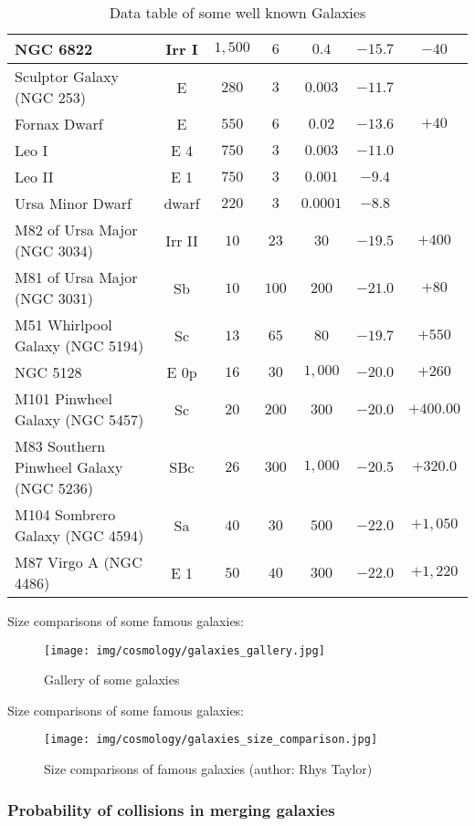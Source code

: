 \begin{table}[H]
{\begin{tabular}{|l|c|c|c|c|c|c|}
		NGC 6822 & Irr I & $1,500$ & $6$ & $0.4$ & $-15.7$ & $-40$ \\ \hline
		Sculptor Galaxy (NGC 253) & E & $280$ & $3$ & $0.003$ & $-11.7$ &  \\ \hline
		Fornax Dwarf & E & $550$ & $6$ & $0.02$ & $-13.6$ & $+40$  \\ \hline
		Leo I & E 4 & $750$ & $3$ & $0.003$ & $-11.0$ &  \\ \hline
		Leo II & E 1 & $750$ & $3$ & $0.001$ & $-9.4$ &  \\ \hline
		Ursa Minor Dwarf & dwarf & $220$ & $3$ & $0.0001$ & $-8.8$ &  \\ \hline
		M82 of Ursa Major (NGC 3034) & Irr II & $10$ & $23$ & $30$ & $-19.5$ & $+400$ \\ \hline
		M81 of Ursa Major (NGC 3031) & Sb & $10$ & $100$ & $200$ & $-21.0$ & $+80$ \\ \hline
		M51 Whirlpool Galaxy (NGC 5194) & Sc & $13$ & $65$ & $80$ & $-19.7$ & $+550$ \\ \hline
		NGC 5128 & E 0p & $16$ & $30$ & $1,000$ & $-20.0$ & $+260$ \\ \hline
		M101 Pinwheel Galaxy  (NGC 5457) & Sc & $20$ & $200$ & $300$ & $-20.0$ & $+400.00$ \\ \hline
		M83 Southern Pinwheel Galaxy (NGC 5236) & SBc & $26$ & $300$ & $1,000$ & $-20.5$ & $+320.0$ \\ \hline
		M104 Sombrero Galaxy (NGC 4594) & Sa & $40$ & $30$ & $500$ & $-22.0$ & $+1,050$ \\ \hline
		M87 Virgo A (NGC 4486) & E 1 & $50$ & $40$ & $300$ & $-22.0$ & $+1,220$ \\ \hline
		\end{tabular}}
		\caption{Data table of some well known Galaxies}
	\end{table}
	Size comparisons of some famous galaxies:
	\begin{figure}[H]
		\centering
		\texttt{[image: img/cosmology/galaxies\_gallery.jpg]}
		\caption{Gallery of some galaxies}
	\end{figure}
	Size comparisons of some famous galaxies:
	\begin{figure}[H]
		\centering
		\texttt{[image: img/cosmology/galaxies\_size\_comparison.jpg]}
		\caption[Size comparisons of famous galaxies]{Size comparisons of famous galaxies (author: Rhys Taylor)}
	\end{figure}
	
	\subsubsection{Probability of collisions in merging galaxies}
	
